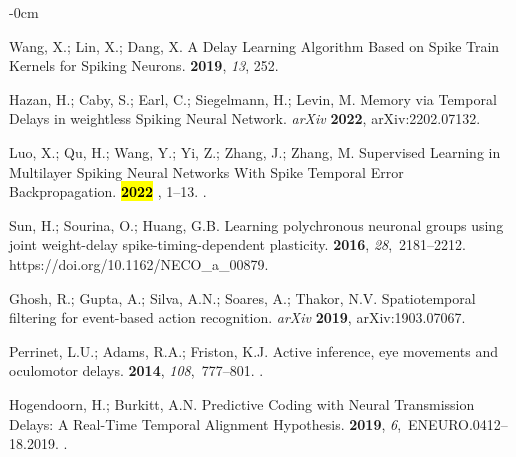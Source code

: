 \documentclass[brainsci, %
               review,accept,pdftex,moreauthors
               ]{Definitions/mdpi}
\begin{document}
\begin{adjustwidth}{-\extralength}{0cm}
\begin{thebibliography}{999}
Wang, X.; Lin, X.; Dang, X.
\newblock A {Delay} {Learning} {Algorithm} {Based} on {Spike} {Train} {Kernels}
  for {Spiking} {Neurons}.
 {\bf 2019}, {\em 13}, 252.

Hazan, H.; Caby, S.; Earl, C.; Siegelmann, H.; Levin, M.
\newblock Memory via {Temporal} {Delays} in weightless {Spiking} {Neural}
  {Network}.  \emph{arXiv} \textbf{2022}, arXiv:2202.07132.

Luo, X.; Qu, H.; Wang, Y.; Yi, Z.; Zhang, J.; Zhang, M.
\newblock Supervised {Learning} in {Multilayer} {Spiking} {Neural} {Networks}
  {With} {Spike} {Temporal} {Error} {Backpropagation}.
 {\bf
  \hl{2022} %
}, 1--13.
.

Sun, H.; Sourina, O.; Huang, G.B.
\newblock Learning polychronous neuronal groups using joint weight-delay
  spike-timing-dependent plasticity.
 {\bf 2016}, {\em 28},~2181--2212.
  {{https://doi.org/10.1162/NECO\_a\_00879}}.

Ghosh, R.; Gupta, A.; Silva, A.N.; Soares, A.; Thakor, N.V.
\newblock Spatiotemporal filtering for event-based action recognition. \emph{arXiv}  \textbf{2019},  	arXiv:1903.07067.

Perrinet, L.U.; Adams, R.A.; Friston, K.J.
\newblock Active inference, eye movements and oculomotor delays.
 {\bf 2014}, {\em 108},~777--801.
.

Hogendoorn, H.; Burkitt, A.N.
\newblock Predictive {Coding} with {Neural} {Transmission} {Delays}: {A}
  {Real}-{Time} {Temporal} {Alignment} {Hypothesis}.
 {\bf 2019}, {\em 6},~ENEURO.0412--18.2019.
.


\end{thebibliography}
\end{adjustwidth}
\end{document}
